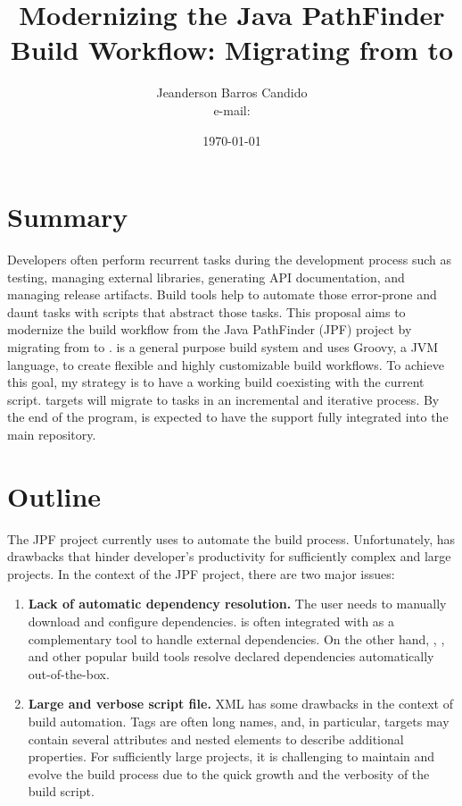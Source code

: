\documentclass{article}
\author{Jeanderson Barros Candido\\ e-mail: \email{jeandersonbc@gmail.com}}
\title{Modernizing the Java PathFinder Build Workflow: Migrating from \ant{} to
\gradle{}}
\date{\today}
\begin{document}
\maketitle

\section{Summary}

Developers often perform recurrent tasks during the development process such as
testing, managing external libraries, generating API documentation, and
managing release artifacts.
Build tools help to automate those error-prone and daunt tasks with scripts
that abstract those tasks.
This proposal aims to modernize the build workflow from the Java PathFinder
(JPF) project by migrating from \ant{} to \gradle{}.
\gradle{} is a general purpose build system and uses Groovy, a JVM language, to
create flexible and highly customizable build workflows.
To achieve this goal, my strategy is to have a working \gradle{} build
coexisting with the current \ant{} script.
\ant{} targets will migrate to \gradle{} tasks in an incremental and iterative
process.
By the end of the program, is expected to have the \gradle{} support fully
integrated into the main repository.

\section{Outline}
\label{sec:intro}

The JPF project currently uses \ant{} to automate the build process.
Unfortunately, \ant{} has drawbacks that hinder developer's productivity for
sufficiently complex and large projects.
In the context of the JPF project, there are two major issues:

\begin{enumerate}

\item \textbf{Lack of automatic dependency resolution.}
The user needs to manually download and configure dependencies.
\ant{} is often integrated with \ivy{}\cite{page:ivy} as a complementary
tool to handle external dependencies.
On the other hand, \gradle{}\cite{page:gradle}, \maven{}\cite{page:maven},
and other popular build tools resolve declared dependencies automatically
out-of-the-box.

\item \textbf{Large and verbose script file.}
XML has some drawbacks in the context of build automation.
Tags are often long names, and, in particular, \ant{} targets may
contain several attributes and nested elements to describe additional
properties.
For sufficiently large projects, it is challenging to maintain and evolve the
build process due to the quick growth and the verbosity of the build script.

\end{enumerate}
\end{document}
